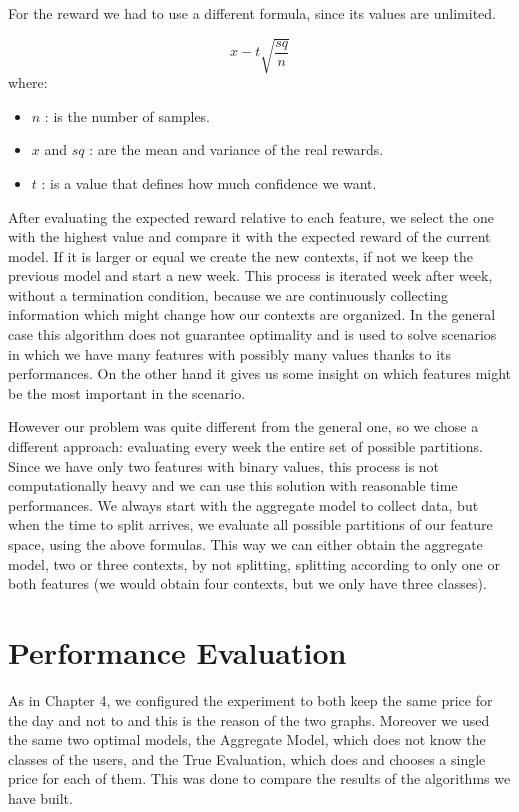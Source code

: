 	For the reward we had to use a different formula, since its values are unlimited.

\begin{equation}
	x - t \sqrt{\frac{sq} {n}}
\end{equation}
where:
\begin{itemize}
	\item $n$ : is the number of samples.
	\item $x$ and $sq$ : are the mean and variance of the real rewards.
	\item $t$ : is a value that defines how much confidence we want.
\end{itemize}

After evaluating the expected reward relative to each feature, we select the one with the highest value and compare it with the expected reward of the current model.
If it is larger or equal we create the new contexts, if not we keep the previous model and start a new week.
This process is iterated week after week, without a termination condition, because we are continuously collecting information which might change how our contexts are organized.
In the general case this algorithm does not guarantee optimality and is used to solve scenarios in which we have many features with possibly many values thanks to its performances.
On the other hand it gives us some insight on which features might be the most important in the scenario.

However our problem was quite different from the general one, so we chose a different approach: evaluating every week the entire set of possible partitions.
Since we have only two features with binary values, this process is not computationally heavy and we can use this solution with reasonable time performances.
We always start with the aggregate model to collect data, but when the time to split arrives, we evaluate all possible partitions of our feature space, using the above formulas.
This way we can either obtain the aggregate model, two or three contexts, by not splitting, splitting according to only one or both features (we would obtain four contexts, but we only have three classes).

\section{Performance Evaluation}\label{sec:performance-evaluation-5}

As in Chapter 4, we configured the experiment to both keep the same price for the day and not to and this is the reason of the two graphs.
Moreover we used the same two optimal models, the Aggregate Model, which does not know the classes of the users, and the True Evaluation, which does and chooses a single price for each of them.
This was done to compare the results of the algorithms we have built.

